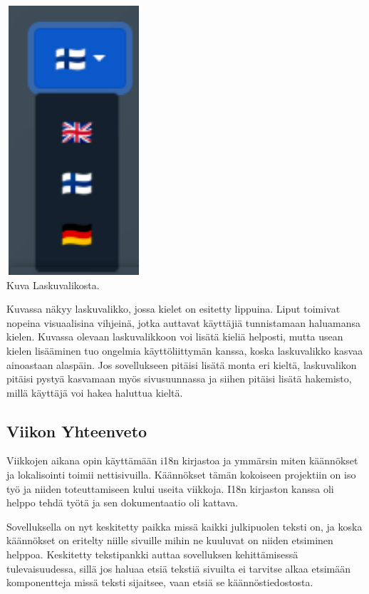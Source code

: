 \documentclass[11pt,a4paper,titlepage,oneside]{article}
\begin{document}
\medskip
\includegraphics[width= 5cm, height=10cm]{src/public/locale_laskuvalikko.png} \\
\medskip
Kuva Laskuvalikosta.
\medskip

Kuvassa näkyy laskuvalikko, jossa kielet on esitetty lippuina.
Liput toimivat nopeina visuaalisina vihjeinä, jotka auttavat käyttäjiä tunnistamaan haluamansa kielen.
Kuvassa olevaan laskuvalikkoon voi lisätä kieliä helposti, mutta usean kielen lisääminen tuo ongelmia käyttöliittymän kanssa, koska laskuvalikko kasvaa ainoastaan alaspäin.
Jos sovellukseen pitäisi lisätä monta eri kieltä, laskuvalikon pitäisi pystyä kasvamaan myös sivusuunnassa ja siihen pitäisi lisätä hakemisto, millä käyttäjä voi hakea haluttua kieltä.
\medskip



\subsection*{Viikon Yhteenveto}


Viikkojen aikana opin käyttämään i18n kirjastoa ja ymmärsin miten käännökset ja lokalisointi toimii nettisivuilla.
Käännökset tämän kokoiseen projektiin on iso työ ja niiden toteuttamiseen kului useita viikkoja.
I18n kirjaston kanssa oli helppo tehdä työtä ja sen dokumentaatio oli kattava.
\medskip

Sovelluksella on nyt keskitetty paikka missä kaikki julkipuolen teksti on, ja koska käännökset on eritelty niille sivuille mihin ne kuuluvat on niiden etsiminen helppoa.
Keskitetty tekstipankki auttaa sovelluksen kehittämisessä tulevaisuudessa, sillä jos haluaa etsiä tekstiä sivuilta ei tarvitse alkaa etsimään komponentteja missä teksti sijaitsee, vaan etsiä se käännöstiedostosta.\medskip
\end{document}
